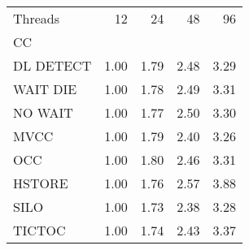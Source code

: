 \begin{tabular}{lrrrr}
\toprule
Threads &   12 &   24 &   48 &   96 \\
CC        &      &      &      &      \\
\midrule
DL DETECT & 1.00 & 1.79 & 2.48 & 3.29 \\
WAIT DIE  & 1.00 & 1.78 & 2.49 & 3.31 \\
NO WAIT   & 1.00 & 1.77 & 2.50 & 3.30 \\
MVCC      & 1.00 & 1.79 & 2.40 & 3.26 \\
OCC       & 1.00 & 1.80 & 2.46 & 3.31 \\
HSTORE    & 1.00 & 1.76 & 2.57 & 3.88 \\
SILO      & 1.00 & 1.73 & 2.38 & 3.28 \\
TICTOC    & 1.00 & 1.74 & 2.43 & 3.37 \\
\bottomrule
\end{tabular}

